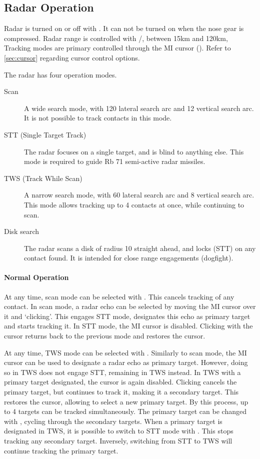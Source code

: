 \subsection{Radar Operation}
Radar is turned on or off with .
It can not be turned on when the nose gear is compressed.
Radar range is controlled with \keys{[}/\keys{]}, between 15km and 120km,
Tracking modes are primary controlled through the MI cursor ().
Refer to \cref{sec:cursor} regarding cursor control options.

The radar has four operation modes.
\begin{description}
  \item[Scan] A wide search mode, with 120\textdegree{} lateral search arc and 12\textdegree{} vertical search arc.
    It is not possible to track contacts in this mode.
  \item[STT (Single Target Track)] The radar focuses on a single target, and is blind to anything else.
    This mode is required to guide Rb 71 semi-active radar missiles.
  \item[TWS (Track While Scan)] A narrow search mode, with 60\textdegree{} lateral search arc and 8\textdegree{} vertical search arc.
    This mode allows tracking up to 4 contacts at once, while continuing to scan.
  \item[Disk search] The radar scans a disk of radius 10\textdegree{} straight ahead,
    and locks (STT) on any contact found. It is intended for close range engagements (dogfight).
\end{description}

\paragraph{Normal Operation}
At any time, scan mode can be selected with . This cancels tracking of any contact.
In scan mode, a radar echo can be selected by moving the MI cursor over it and `clicking'.
This engages STT mode, designates this echo as primary target and starts tracking it.
In STT mode, the MI cursor is disabled.
Clicking with the cursor returns back to the previous mode and restores the cursor.

At any time, TWS mode can be selected with .
Similarly to scan mode, the MI cursor can be used to designate a radar echo as primary target.
However, doing so in TWS does not engage STT, remaining in TWS instead.
In TWS with a primary target designated, the cursor is again disabled.
Clicking cancels the primary target, but continues to track it, making it a secondary target.
This restores the cursor, allowing to select a new primary target.
By this process, up to 4 targets can be tracked simultaneously.
The primary target can be changed with , cycling through the secondary targets.
When a primary target is designated in TWS, it is possible to switch to STT mode with .
This stops tracking any secondary target.
Inversely, switching from STT to TWS will continue tracking the primary target.

